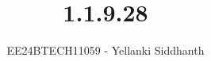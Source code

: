 \documentclass[journal]{IEEEtran}
\begin{document}

\vspace{3cm}

\title{1.1.9.28}
\author{EE24BTECH11059 - Yellanki Siddhanth
}
{\let\newpage\relax\maketitle}

\renewcommand{\thefigure}{\theenumi}
\renewcommand{\thetable}{\theenumi}
\setlength{\intextsep}{10pt} %


\renewcommand{\thetable}{\theenumi}
\end{document}
